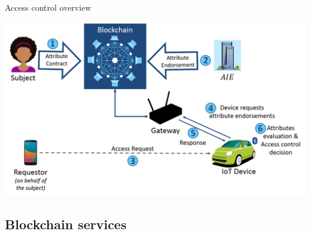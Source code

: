 \begin{frame}{Access control overview}
    \begin{center}
        \includegraphics[scale=0.36]{Figures/MAAC-B_AC_high_level.png}
    \end{center}
\end{frame}


\subsection{Blockchain services}

